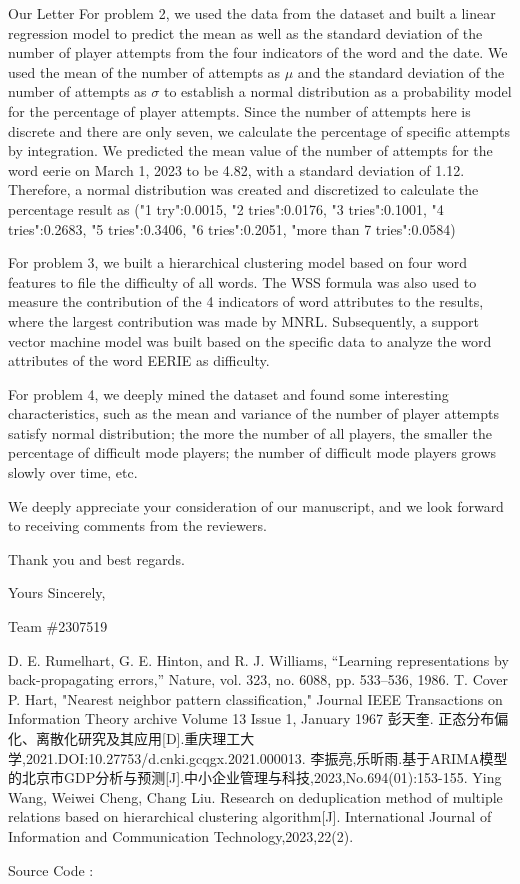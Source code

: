 \documentclass[12pt]{article}  %
\begin{document}
\begin{letter}{Our Letter}
For problem 2, we used the data from the dataset and built a linear regression model to predict the mean as well as the standard deviation of the number of player attempts from the four indicators of the word and the date. We used the mean of the number of attempts as $\mu$ and the standard deviation of the number of attempts as $\sigma$ to establish a normal distribution as a probability model for the percentage of player attempts. Since the number of attempts here is discrete and there are only seven, we calculate the percentage of specific attempts by integration. We predicted the mean value of the number of attempts for the word eerie on March 1, 2023 to be 4.82, with a standard deviation of 1.12. Therefore, a normal distribution was created and discretized to calculate the percentage result as ("1 try":0.0015, "2 tries":0.0176, "3 tries":0.1001, "4 tries":0.2683, "5 tries":0.3406, "6 tries":0.2051, "more than 7 tries":0.0584)

For problem 3, we built a hierarchical clustering model based on four word features to file the difficulty of all words. The WSS formula was also used to measure the contribution of the 4 indicators of word attributes to the results, where the largest contribution was made by MNRL. Subsequently, a support vector machine model was built based on the specific data to analyze the word attributes of the word EERIE as difficulty.

For problem 4, we deeply mined the dataset and found some interesting characteristics, such as the mean and variance of the number of player attempts satisfy normal distribution; the more the number of all players, the smaller the percentage of difficult mode players; the number of difficult mode players grows slowly over time, etc.

We deeply appreciate your consideration of our manuscript, and we look forward to receiving comments from the reviewers. 

Thank you and best regards.


\hfill Yours Sincerely,

\hfill Team $\#$2307519  
\end{letter}

\begin{thebibliography}{99}
	 D. E. Rumelhart, G. E. Hinton, and R. J. Williams, “Learning representations by back-propagating errors,” Nature, vol. 323, no. 6088, pp. 533–536, 1986.
	 T. Cover  P. Hart, "Nearest neighbor pattern classification," Journal IEEE Transactions on Information Theory archive Volume 13 Issue 1, January 1967
	 彭天奎. 正态分布偏化、离散化研究及其应用[D].重庆理工大学,2021.DOI:10.27753/d.cnki.gcqgx.2021.000013.
	 李振亮,乐昕雨.基于ARIMA模型的北京市GDP分析与预测[J].中小企业管理与科技,2023,No.694(01):153-155.
	 Ying Wang, Weiwei Cheng, Chang Liu. Research on deduplication method of multiple relations based on hierarchical clustering algorithm[J]. International Journal of Information and Communication Technology,2023,22(2).
	\end{thebibliography}

\begin{appendices}
	Source Code : 
\end{appendices}
\end{document}
